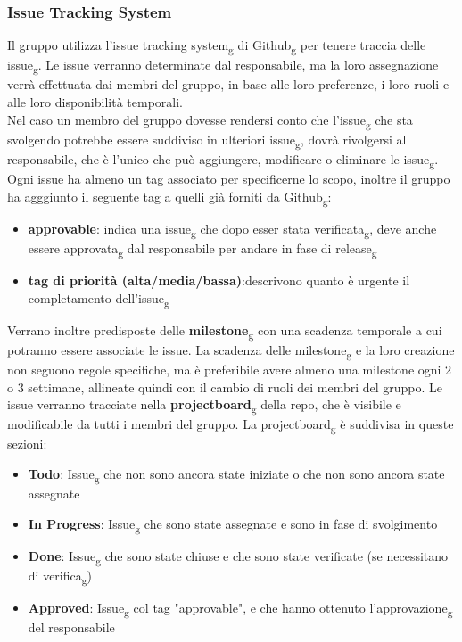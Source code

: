 \subsubsection{Issue Tracking System}
Il gruppo utilizza l'issue tracking system\textsubscript{g} di Github\textsubscript{g} per tenere traccia delle issue\textsubscript{g}. 
Le issue verranno determinate dal responsabile, ma la loro assegnazione verrà effettuata dai membri del gruppo, in base alle loro preferenze, i loro ruoli e alle loro disponibilità temporali.\\
Nel caso un membro del gruppo dovesse rendersi conto che l'issue\textsubscript{g} che sta svolgendo potrebbe essere suddiviso in ulteriori issue\textsubscript{g}, dovrà rivolgersi al responsabile, che è l'unico che può aggiungere, modificare o eliminare le issue\textsubscript{g}.\\
Ogni issue ha almeno un tag associato per specificerne lo scopo, inoltre il gruppo ha agggiunto il seguente tag a quelli già forniti da Github\textsubscript{g}:
\begin{itemize}
	\item \textbf{approvable}: indica una issue\textsubscript{g} che dopo esser stata verificata\textsubscript{g}, deve anche essere approvata\textsubscript{g} dal responsabile per andare in fase di release\textsubscript{g}
	\item \textbf{tag di priorità (alta/media/bassa)}:descrivono quanto è urgente il completamento dell'issue\textsubscript{g} 
\end{itemize}
Verrano inoltre predisposte delle \textbf{milestone}\textsubscript{g} con una scadenza temporale a cui potranno essere associate le issue. 
La scadenza delle milestone\textsubscript{g} e la loro creazione non seguono regole specifiche, ma è preferibile avere almeno una milestone ogni 2 o 3 settimane, allineate quindi con il cambio di ruoli dei membri del gruppo.
Le issue verranno tracciate nella \textbf{projectboard}\textsubscript{g} della repo, che è visibile e modificabile da tutti i membri del gruppo.
La projectboard\textsubscript{g} è suddivisa in queste sezioni:
\begin{itemize}
	\item \textbf{Todo}: Issue\textsubscript{g} che non sono ancora state iniziate o che non sono ancora state assegnate
	\item \textbf{In Progress}: Issue\textsubscript{g} che sono state assegnate e sono in fase di svolgimento
	\item \textbf{Done}: Issue\textsubscript{g} che sono state chiuse e che sono state verificate (se necessitano di verifica\textsubscript{g})
	\item \textbf{Approved}: Issue\textsubscript{g} col tag "approvable", e che hanno ottenuto l'approvazione\textsubscript{g} del responsabile
\end{itemize}


